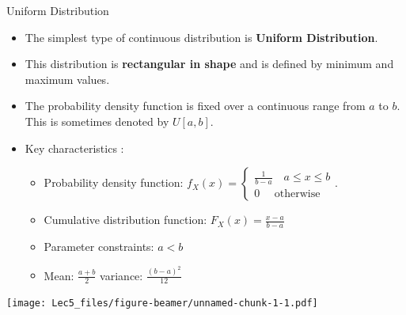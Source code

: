 \documentclass[ignorenonframetext,]{beamer}
\begin{document}
\begin{frame}{Uniform Distribution}

\begin{itemize}
\item
  The simplest type of continuous distribution is \textbf{Uniform
  Distribution}.
\item
  This distribution is \textbf{rectangular in shape} and is defined by
  minimum and maximum values.
\item
  The probability density function is fixed over a continuous range from
  \(a\) to \(b\). This is sometimes denoted by \(U[a,b]\).
\item
  { Key characteristics }:

  \begin{itemize}
  \item
    Probability density function:
    \(f_X(x)=\begin{cases} \frac{1}{b-a}\quad a\le x\le b\\ 0\quad\text{ otherwise} \end{cases}\).
  \item
    Cumulative distribution function: \(F_X(x)=\frac{x-a}{b-a}\)
  \item
    Parameter constraints: \(a<b\)
  \item
    Mean: \(\frac{a+b}{2}\) \frenchspacing  variance:
    \(\frac{(b-a)^2}{12}\)
  \end{itemize}
\end{itemize}

\texttt{[image: Lec5\_files/figure-beamer/unnamed-chunk-1-1.pdf]}

\end{frame}
\end{document}
